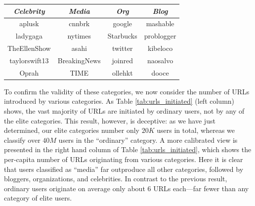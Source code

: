\documentclass[phd,tocprelim]{cornell}
\renewcommand{\caption}[1]{\singlespacing\hangcaption{#1}\normalspacing}
\begin{document}
\begin{table}
\centering
\caption{Top 5 users in each category}
\label{tab:top_k_examples}
\vspace{2pt}
\begin{tabular}{|c|c|c|c|} 
\hline 
\textit{Celebrity} & \textit{Media} & \textit{Org} & \textit{Blog} \\ 
\hline
aplusk & cnnbrk & google & mashable \\
ladygaga & nytimes & Starbucks & problogger \\
TheEllenShow & asahi & twitter & kibeloco \\
taylorswift13 & BreakingNews & joinred & naosalvo \\
Oprah & TIME & ollehkt & dooce \\
\hline 
\end{tabular}
\end{table}


To confirm the validity of these categories, we now consider the number of
URLs introduced by various categories. As Table \ref{tab:urls_initiated}
(left column) shows, the vast majority of URLs are initiated by ordinary
users, not by any of the elite categories.  This result, however, is
deceptive: as we have just determined, our elite categories number only
$20K$ users in total, whereas we classify over $40M$ users in the
``ordinary'' category.  A more calibrated view is presented in the right
hand column of Table \ref{tab:urls_initiated}, which shows the per-capita
number of URLs originating from various categories.  Here it is clear that
users classified as ``media'' far outproduce all other categories, followed
by bloggers, organizations, and celebrities. In contrast to the previous
result, ordinary users originate on average only about $6$ URLs
each---far fewer than any category of elite users.
\end{document}
